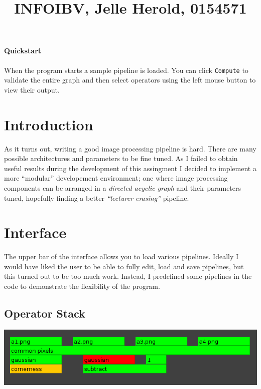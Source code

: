 \documentclass{article}
\title{INFOIBV, Jelle Herold, 0154571}
\begin{document}
\maketitle

\paragraph{Quickstart}
When the program starts a sample pipeline is loaded. You can click
\texttt{Compute} to validate the entire graph and then select operators using
the left mouse button to view their output.

\section{Introduction}

As it turns out, writing a good image processing pipeline is hard. There are
many possible architectures and parameters to be fine tuned. As I failed to
obtain useful results during the development of this assingment I decided to
implement a more ``modular'' developement environment; one where image processing
components can be arranged in a \emph{directed acyclic graph} and their
parameters tuned, hopefully finding a better \emph{``lecturer erasing''} pipeline.

\section{Interface}

The upper bar of the interface allows you to load various pipelines.
Ideally I would have liked the user to be able to fully edit, load and save
pipelines, but this turned out to be too much work. Instead, I predefined some
pipelines in the code to demonstrate the flexibility of the program.

\subsection{Operator Stack}

\begin{center}
\includegraphics[width=\textwidth]{operatorstack.png}
\end{center}
\end{document}
